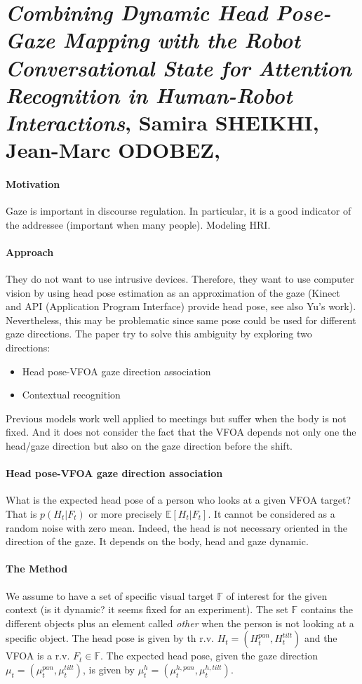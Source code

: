 \documentclass[11pt,a4paper]{article}
\begin{document}
\tableofcontents
\clearpage

\section{\textit{Combining Dynamic Head Pose-Gaze Mapping with the Robot Conversational State for Attention Recognition in Human-Robot Interactions}, Samira SHEIKHI, Jean-Marc ODOBEZ, \cite{Sheikhi2O15}}

\paragraph{Motivation}
Gaze is important in discourse regulation. In particular, it is a good indicator of the addressee (important when many people). Modeling HRI.

\paragraph{Approach}
They do not want to use intrusive devices. Therefore, they want to use computer vision by using head pose estimation as an approximation of the gaze (Kinect and API (Application Program Interface) provide head pose, see also Yu's work). Nevertheless, this may be problematic since same pose could be used for different gaze directions. The paper try to solve this ambiguity by exploring two directions:
\begin{itemize}
\item Head pose-VFOA gaze direction association
\item Contextual recognition
\end{itemize}
Previous models work well applied to meetings but suffer when the body is not fixed. And it does not consider the fact that the VFOA depends not only one the head/gaze direction but also on the gaze direction before the shift.

\paragraph{Head pose-VFOA gaze direction association}
What is the expected head pose of a person who looks at a given VFOA target? That is $p(H_t | F_t)$ or more precisely $\mathbb{E}[H_t | F_t]$. It cannot be considered as a random noise with zero mean. Indeed, the head is not necessary oriented in the direction of the gaze. It depends on the body, head and gaze dynamic.

\paragraph{The Method}
We assume to have a set of specific visual target $\mathbb{F}$ of interest for the given context (is it dynamic? it seems fixed for an experiment). The set $\mathbb{F}$ contains the different objects plus an element called \textit{other} when the person is not looking at a specific object. The head pose is given by th r.v. $H_t=(H_t^{pan}, H_t^{tilt})$ and the VFOA is a r.v. $F_t \in \mathbb{F}$. The expected head pose, given the gaze direction $\mu_t=(\mu_t^{pan}, \mu_t^{tilt})$, is given by $\mu_t^h=(\mu_t^{h,pan}, \mu_t^{h,tilt})$.
\end{document}
